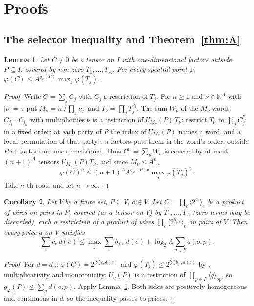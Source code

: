 \documentclass[11pt,a4paper]{article}
\newtheorem{lemma}{Lemma}[section]
\newtheorem{corollary}[lemma]{Corollary}
\theoremstyle{definition}
\newcommand{\wire}[2]{\langle #1\rangle_{#2}}
\begin{document}
\section{Proofs}\label{sec:proofs}

\subsection{The selector inequality and Theorem~\ref{thm:A}}

\begin{lemma}\label{lem:selector}
Let $C\ne0$ be a tensor on $I$ with one-dimensional factors outside $P\subseteq I$,
covered by non-zero $T_1,\dots,T_A$. For every spectral point $\varphi$,
$\varphi(C)\le A^{g_\varphi(P)}\max_j\varphi(T_j)$.
\end{lemma}

\begin{proof}
Write $C=\sum_jC_j$ with $C_j$ a restriction of $T_j$. For $n\ge1$ and
$\nu\in\mathbb N^A$ with $|\nu|=n$ put $M_\nu=n!/\prod_j\nu_j!$ and
$T_\nu=\prod_jT_j^{\nu_j}$. The sum $W_\nu$ of the $M_\nu$ words
$C_{j_1}\cdots C_{j_n}$ with multiplicities $\nu$ is a restriction of
$U_{M_\nu}(P)\,T_\nu$: restrict $T_\nu$ to $\prod_jC_j^{\nu_j}$ in a fixed order;
at each party of $P$ the index of $U_{M_\nu}(P)$ names a word, and a local
permutation of that party's $n$ factors puts them in the word's order; outside $P$
all factors are one-dimensional. Thus $C^n=\sum_\nu W_\nu$ is covered by at most
$(n+1)^A$ tensors $U_{M_\nu}(P)T_\nu$, and since $M_\nu\le A^n$,
\[
\varphi(C)^n\le(n+1)^AA^{g_\varphi(P)n}\max_j\varphi(T_j)^n .
\]
Take $n$-th roots and let $n\to\infty$.
\end{proof}

\begin{corollary}\label{cor:homogeneous}
Let $V$ be a finite set, $P\subseteq V$, $o\in V$. Let $C=\prod_e\wire{2^{c_e}}{e}$
be a product of wires on pairs in $P$, covered (as a tensor on $V$) by
$T_1,\dots,T_A$ (zero terms may be discarded), each a restriction of a product of
wires
$\prod_e\wire{2^{b_{j,e}}}{e}$ on pairs of $V$. Then every price $d$ on $V$
satisfies
\[
\sum_ec_e\,d(e)\le\max_j\sum_eb_{j,e}\,d(e)+\log_2A\sum_{p\in P}d(o,p).
\]
\end{corollary}

\begin{proof}
For $d=d_\varphi$: $\varphi(C)=2^{\sum c_ed(e)}$ and $\varphi(T_j)\le
2^{\sum b_{j,e}d(e)}$ by \cite[Lemma~A.2]{Ant}, multiplicativity and monotonicity;
$U_q(P)$ is a restriction of $\prod_{p\in P}\wire{q}{op}$, so
$g_\varphi(P)\le\sum_pd(o,p)$. Apply Lemma~\ref{lem:selector}. Both sides are
positively homogeneous and continuous in $d$, so the inequality passes to
prices.
\end{proof}
\end{document}
